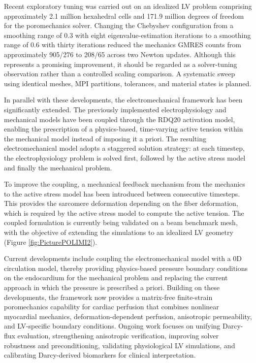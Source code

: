 \documentclass[a4paper,12pt]{article}
\begin{document}
Recent exploratory tuning was carried out on an idealized LV problem comprising approximately 2.1 million hexahedral cells and 171.9 million degrees of freedom for the poromechanics solver. Changing the Chebyshev configuration from a smoothing range of 0.3 with eight eigenvalue-estimation iterations to a smoothing range of 0.6 with thirty iterations reduced the mechanics GMRES counts from approximately 905/276 to 208/65 across two Newton updates. Although this represents a promising improvement, it should be regarded as a solver-tuning observation rather than a controlled scaling comparison. A systematic sweep using identical meshes, MPI partitions, tolerances, and material states is planned.

In parallel with these developments, the electromechanical framework has been significantly extended. The previously implemented electrophysiology and mechanical models have been coupled through the RDQ20 activation model, enabling the prescription of a physics-based, time-varying active tension within the mechanical model instead of imposing it a priori. The resulting electromechanical model adopts a staggered solution strategy: at each timestep, the electrophysiology problem is solved first, followed by the active stress model and finally the mechanical problem. 

To improve the coupling, a mechanical feedback mechanism from the mechanics to the active stress model has been introduced between consecutive timesteps.  This provides the sarcomere deformation depending on the fiber deformation, which is required by the active stress model to compute the active tension. The coupled formulation is currently being validated on a beam benchmark mesh, with the objective of extending the simulations to an idealized LV geometry (Figure \ref{fig:PicturePOLIMI2}).

Current developments include coupling the electromechanical model with a 0D circulation model, thereby providing physics-based pressure boundary conditions on the endocardium for the mechanical problem and replacing the current approach in which the pressure is prescribed a priori.
Building on these developments, the framework now provides a matrix-free finite-strain poromechanics capability for cardiac perfusion that combines nonlinear myocardial mechanics, deformation-depen\-dent perfusion, anisotropic permeability, and LV-specific boundary conditions. Ongoing work focuses on unifying Darcy-flux evaluation, strengthening anisotropic verification, improving solver robustness and preconditioning, validating physiological LV simulations, and calibrating Darcy-derived biomarkers for clinical interpretation.
\end{document}
